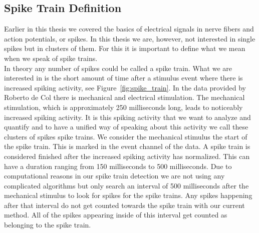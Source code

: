 \subsection{Spike Train Definition}
Earlier in this thesis we covered the basics of electrical signals in nerve fibers and action potentials, or spikes. In this thesis we are, however, not interested in single spikes but in clusters of them. For this it is important to define what we mean when we speak of spike trains.\\
In theory any number of spikes could be called a spike train. What we are interested in is the short amount of time after a stimulus event where there is increased spiking activity, see Figure~\ref{fig:spike_train}. In the data provided by Roberto de Col there is mechanical and electrical stimulation. The mechanical stimulation, which is approximately 250 milliseconds long, leads to noticeably increased spiking activity. It is this spiking activity that we want to analyze and quantify and to have a unified way of speaking about this activity we call these clusters of spikes spike trains. We consider the mechanical stimulus the start of the spike train. This is marked in the event channel of the data. A spike train is considered finished after the increased spiking activity has normalized. This can have a duration ranging from 150 milliseconds to 500 milliseconds. Due to computational reasons in our spike train detection we are not using any complicated algorithms but only search an interval of 500 milliseconds after the mechanical stimulus to look for spikes for the spike trains. Any spikes happening after that interval do not get counted towards the spike train with our current method. All of the spikes appearing inside of this interval get counted as belonging to the spike train.

